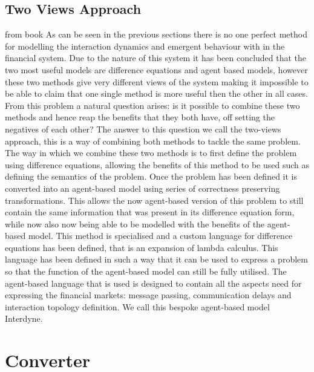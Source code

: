 \documentclass{article}
\begin{document}
\subsection{Two Views Approach} 


from book
As can be seen in the previous sections there is no one perfect method for modelling the interaction dynamics and emergent behaviour with in the financial system. Due to the nature of this system it has been concluded that the two most useful models are difference equations and agent based models, however these two methods give very different views of the system making it impossible to be able to claim that one single method is more useful then the other in all cases. From this problem a natural question arises: is it possible to combine these two methods and hence reap the benefits that they both have, off setting the negatives of each other? The answer to this question we call the two-views approach, this is a way of combining both methods to tackle the same problem. The way in which we combine these two methods is to first define the problem using difference equations, allowing the benefits of this method to be used such as defining the semantics of the problem. Once the problem has been defined it is converted into an agent-based model using series of correctness preserving transformations. This allows the now agent-based version of this problem to still contain the same information that was present in its difference equation form, while now also now being able to be modelled with the benefits of the agent-based model.      
This method is specialised and a custom language for difference equations has been defined, that is an expansion of lambda calculus. This language has been defined in such a way that it can be used to express a problem so that the function of the agent-based model can still be fully utilised. The agent-based language that is used is designed to contain all the aspects need for expressing the financial markets: message passing, communication delays and interaction topology definition. We call this bespoke agent-based model Interdyne. 

\section{Converter} 
\end{document}
